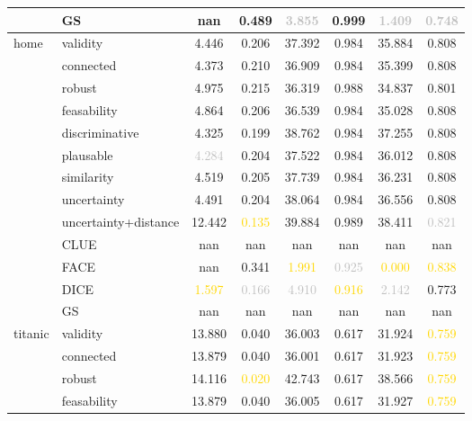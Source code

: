 \begin{table}[ht]
\begin{tabular}{l l c c c c c c}
 & GS & nan & 0.489 & \textcolor{silver}{3.855} & 0.999 & \textcolor{silver}{1.409} & \textcolor{silver}{0.748} \\
\hline
\multirow{13}{*}{home} & validity & 4.446 & 0.206 & 37.392 & \textcolor{bronze}{0.984} & 35.884 & \textcolor{bronze}{0.808} \\
 & connected & 4.373 & 0.210 & 36.909 & \textcolor{bronze}{0.984} & 35.399 & \textcolor{bronze}{0.808} \\
 & robust & 4.975 & 0.215 & \textcolor{bronze}{36.319} & 0.988 & \textcolor{bronze}{34.837} & 0.801 \\
 & feasability & 4.864 & 0.206 & 36.539 & \textcolor{bronze}{0.984} & 35.028 & \textcolor{bronze}{0.808} \\
 & discriminative & \textcolor{bronze}{4.325} & \textcolor{bronze}{0.199} & 38.762 & \textcolor{bronze}{0.984} & 37.255 & 0.808 \\
 & plausable & \textcolor{silver}{4.284} & 0.204 & 37.522 & \textcolor{bronze}{0.984} & 36.012 & 0.808 \\
 & similarity & 4.519 & 0.205 & 37.739 & \textcolor{bronze}{0.984} & 36.231 & \textcolor{bronze}{0.808} \\
 & uncertainty & 4.491 & 0.204 & 38.064 & \textcolor{bronze}{0.984} & 36.556 & \textcolor{bronze}{0.808} \\
 & uncertainty+distance & 12.442 & \textcolor{gold}{0.135} & 39.884 & 0.989 & 38.411 & \textcolor{silver}{0.821} \\
 & CLUE & nan & nan & nan & nan & nan & nan \\
 & FACE & nan & 0.341 & \textcolor{gold}{1.991} & \textcolor{silver}{0.925} & \textcolor{gold}{0.000} & \textcolor{gold}{0.838} \\
 & DICE & \textcolor{gold}{1.597} & \textcolor{silver}{0.166} & \textcolor{silver}{4.910} & \textcolor{gold}{0.916} & \textcolor{silver}{2.142} & 0.773 \\
 & GS & nan & nan & nan & nan & nan & nan \\
\hline
\multirow{13}{*}{titanic} & validity & 13.880 & 0.040 & 36.003 & 0.617 & 31.924 & \textcolor{gold}{0.759} \\
 & connected & 13.879 & 0.040 & 36.001 & 0.617 & 31.923 & \textcolor{gold}{0.759} \\
 & robust & 14.116 & \textcolor{gold}{0.020} & 42.743 & 0.617 & 38.566 & \textcolor{gold}{0.759} \\
 & feasability & 13.879 & 0.040 & 36.005 & 0.617 & 31.927 & \textcolor{gold}{0.759} \\

\end{tabular}
\end{table}
